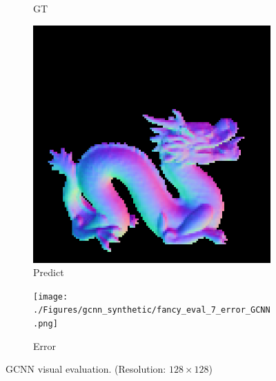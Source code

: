\begin{figure}[H]
\begin{subfigure}[b]{0.24\linewidth}
		\caption{GT}
	\end{subfigure}
	\begin{subfigure}[b]{0.24\linewidth}
		\includegraphics[width=\linewidth]{./Figures/gcnn_synthetic/fancy_eval_7_normal_GCNN-GCNN.png}
		\caption{Predict}
	\end{subfigure}
	\begin{subfigure}[b]{0.24\linewidth}
		\texttt{[image: ./Figures/gcnn\_synthetic/fancy\_eval\_7\_error\_GCNN.png]}
		\caption{Error}
	\end{subfigure}
	
	\decoRule
	\caption{GCNN visual evaluation. (Resolution: $ 128\times128 $)}
	\label{fig:gcnn-eval}
\end{figure}

